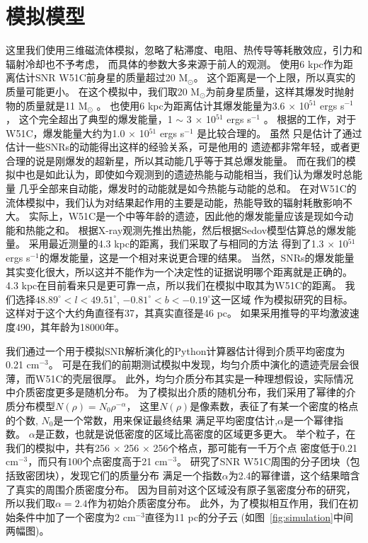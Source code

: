 \section{模拟模型}
\label{W51Cmod}
这里我们使用三维磁流体模拟，忽略了粘滞度、电阻、热传导等耗散效应，引力和辐射冷却也不予考虑，
而具体的参数大多来源于前人的观测。
\citet{Sasaki2014}使用6 kpc作为距离估计SNR W51C前身星的质量超过20 M$_\odot$。
这个距离是一个上限，所以真实的质量可能更小。
在这个模拟中，我们取20 M$_\odot$为前身星质量，这样其爆发时抛射物的质量就是11 M$_\odot$
\citep{Sukhbold2016}。
\citet{Koo1995}也使用6 kpc为距离估计其爆发能量为3.6 $\times$ 10$^{51}$ ergs s$^{-1}$，
这个完全超出了典型的爆发能量，1 $\sim$ 3 $\times$ 10$^{51}$ ergs s$^{-1}$ \citep{Poznanski2013}。
根据\citet{Poznanski2013}的工作，对于W51C，爆发能量大约为1.0 $\times$ 10$^{51}$ ergs s$^{-1}$
是比较合理的。
虽然 \citet{Poznanski2013}只是估计了通过估计一些SNRs的动能得出这样的经验关系，可是他用的
遗迹都非常年轻，或者更合理的说是刚爆发的超新星，所以其动能几乎等于其总爆发能量。
而在我们的模拟中也是如此认为，即使如今观测到的遗迹热能与动能相当，我们认为爆发时总能量
几乎全部来自动能，爆发时的动能就是如今热能与动能的总和。
在对W51C的流体模拟中，我们认为对结果起作用的主要是动能，热能导致的辐射耗散影响不大。
实际上，W51C是一个中等年龄的遗迹，因此他的爆发能量应该是现如今动能和热能之和。
\citet{Koo1995}根据X-ray观测先推出热能，然后根据Sedov模型估算总的爆发能量\citep{1959sdmm.book.....S}。
采用最近测量的4.3 kpc的距离\citep{Tian2013}，我们采取了与\citet{Koo1995}相同的方法
得到了1.3 $\times$ 10$^{51}$ ergs s$^{-1}$的爆发能量，这是一个相对来说更合理的结果。
当然，SNRs的爆发能量其实变化很大，所以这并不能作为一个决定性的证据说明哪个距离就是正确的。
4.3 kpc在目前看来只是更可靠一点，所以我们在模拟中取其为W51C的距离。
我们选择$48.89^{\circ}<l<49.51^{\circ}$, $-0.81^{\circ}<b<-0.19^{\circ}$这一区域
作为模拟研究的目标。
这样对于这个大约角直径有37，其真实直径是46 pc。
如果采用\citet{Koo1995}推导的平均激波速度490\kms，其年龄为18000年。

我们通过一个用于模拟SNR解析演化的Python计算器\citep{Leahy2017a}估计得到介质平均密度为
0.21 cm$^{-3}$。
可是在我们的前期测试模拟中发现，均匀介质中演化的遗迹壳层会很薄，而W51C的壳层很厚。
此外，均匀介质分布其实是一种理想假设，实际情况中介质密度更多是随机分布。
为了模拟出介质的随机分布，我们采用了幂律的介质分布模型$N(\rho) = N_0 \rho^{-\alpha}$，
这里$N(\rho)$是像素数，表征了有某一个密度的格点的个数, $N_0$是一个常数，用来保证最终结果
满足平均密度估计,$\alpha$是一个幂律指数。
$\alpha$是正数，也就是说低密度的区域比高密度的区域更多更大。
举个粒子，在我们的模拟中，共有256 $\times$ 256 $\times$ 256个格点，那可能有一千万个点
密度低于0.21 cm$^{-3}$，而只有100个点密度高于21 cm$^{-3}$。
\citet{Parsons2012} 研究了SNR W51C周围的分子团块（包括致密团块），发现它们的质量分布
满足一个指数$\alpha$为2.4的幂律谱，这个结果暗含了真实的周围介质密度分布。
因为目前对这个区域没有原子氢密度分布的研究，所以我们取$\alpha=2.4$作为初始介质密度分布。
此外，为了模拟相互作用，我们在初始条件中加了一个密度为2 cm$^{-3}$直径为11 pc的分子云
(如图~\ref{fig:simulation}中间两幅图)。

